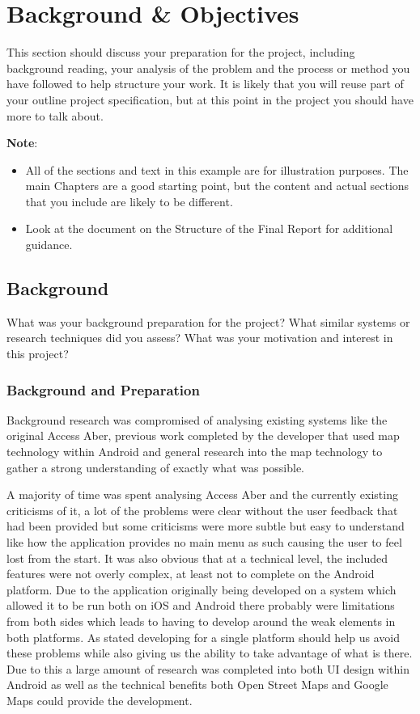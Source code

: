 \chapter{Background \& Objectives}

This section should discuss your preparation for the project, including background reading, your analysis of the problem and the process or method you have followed to help structure your work.  It is likely that you will reuse part of your outline project specification, but at this point in the project you should have more to talk about. 

\textbf{Note}: 

\begin{itemize}
   \item All of the sections and text in this example are for illustration purposes. The main Chapters are a good starting point, but the content and actual sections that you include are likely to be different.
   
   \item Look at the document on the Structure of the Final Report for additional guidance. 
   
\end {itemize}

\section{Background}
What was your background preparation for the project? What similar systems or research techniques did you assess? What was your motivation and interest in this project? 
\subsection{Background and Preparation}
Background research was compromised of analysing existing systems like the original Access Aber, previous work completed by the developer that used map technology within Android and general research into the map technology to gather a strong understanding of exactly what was possible.

A majority of time was spent analysing Access Aber and the currently existing criticisms of it, a lot of the problems were clear without the user feedback that had been provided but some criticisms were more subtle but easy to understand like how the application provides no main menu as such causing the user to feel lost from the start. It was also obvious that at a technical level, the included features were not overly complex, at least not to complete on the Android platform. Due to the application originally being developed on a system which allowed it to be run both on iOS and Android there probably were limitations from both sides which leads to having to develop around the weak elements in both platforms. As stated developing for a single platform should help us avoid these problems while also giving us the ability to take advantage of what is there. Due to this a large amount of research was completed into both UI design within Android as well as the technical benefits both Open Street Maps and Google Maps could provide the development. 

